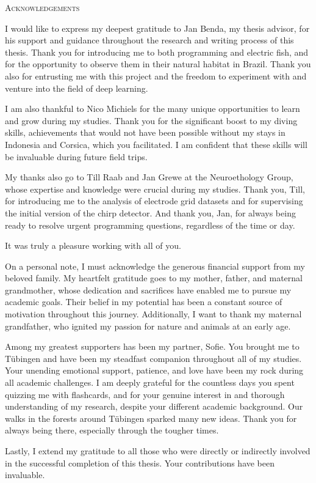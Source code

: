 \begin{center}
  \textsc{Acknowledgements}
\end{center}

\noindent

I would like to express my deepest gratitude to Jan Benda, my thesis advisor,
for his support and guidance throughout the research and writing process of
this thesis. Thank you for introducing me to both programming and electric
fish, and for the opportunity to observe them in their natural habitat in
Brazil. Thank you also for entrusting me with this project and the freedom to
experiment with and venture into the field of deep learning.

I am also thankful to Nico Michiels for the many unique opportunities to learn
and grow during my studies. Thank you for the significant boost to my diving
skills, achievements that would not have been possible without my stays in
Indonesia and Corsica, which you facilitated. I am confident that these skills
will be invaluable during future field trips.

My thanks also go to Till Raab and Jan Grewe at the Neuroethology Group, whose
expertise and knowledge were crucial during my studies. Thank you, Till, for
introducing me to the analysis of electrode grid datasets and for supervising
the initial version of the chirp detector. And thank you, Jan, for always being
ready to resolve urgent programming questions, regardless of the time or day.

It was truly a pleasure working with all of you.

On a personal note, I must acknowledge the generous financial support from my
beloved family. My heartfelt gratitude goes to my mother, father, and maternal
grandmother, whose dedication and sacrifices have enabled me to pursue my
academic goals. Their belief in my potential has been a constant source of
motivation throughout this journey. Additionally, I want to thank my maternal
grandfather, who ignited my passion for nature and animals at an early age.

Among my greatest supporters has been my partner, Sofie. You brought me to
Tübingen and have been my steadfast companion throughout all of my studies.
Your unending emotional support, patience, and love have been my rock during
all academic challenges. I am deeply grateful for the countless days you spent
quizzing me with flashcards, and for your genuine interest in and thorough
understanding of my research, despite your different academic background. Our
walks in the forests around Tübingen sparked many new ideas. Thank you for
always being there, especially through the tougher times.

Lastly, I extend my gratitude to all those who were directly or indirectly
involved in the successful completion of this thesis. Your contributions have
been invaluable.
